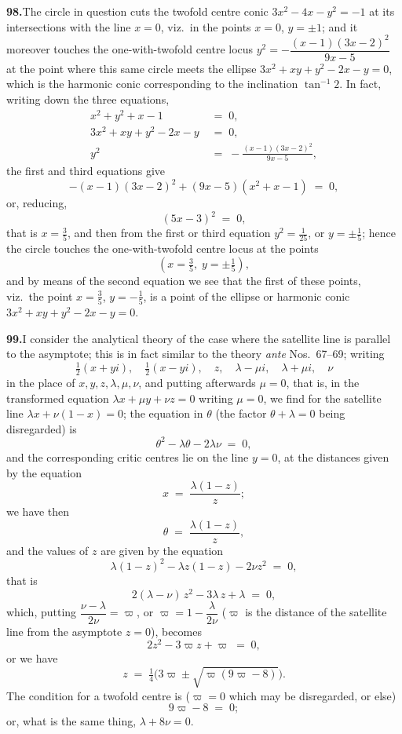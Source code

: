 \documentclass[11pt]{article}
\begin{document}
\medskip
\textbf{98.}\quad The circle in question cuts the twofold centre conic $3 x^{2} - 4 x - y^{2} = -1$ at its intersections with the line $x = 0$, viz.\ in the points $x = 0$, $y = \pm 1$; and it moreover touches the one-with-twofold centre locus $y^{2} = -\dfrac{(x-1)(3x-2)^{2}}{9 x - 5}$ at the point where this same circle meets the ellipse $3 x^{2} + x y + y^{2} - 2 x - y = 0$, which is the harmonic conic corresponding to the inclination $\tan^{-1} 2$. In fact, writing down the three equations,
\begin{align*}
x^{2} + y^{2} + x - 1 &\;=\; 0,\\
3 x^{2} + x y + y^{2} - 2 x - y &\;=\; 0,\\
y^{2} &\;=\; -\frac{(x-1)(3x-2)^{2}}{9 x - 5},
\end{align*}
the first and third equations give
\[
-(x-1)(3x-2)^{2} + (9 x - 5)(x^{2} + x - 1) \;=\; 0,
\]
or, reducing,
\[
(5 x - 3)^{2} \;=\; 0,
\]
that is $x = \tfrac{3}{5}$, and then from the first or third equation $y^{2} = \tfrac{1}{25}$, or $y = \pm\tfrac{1}{5}$; hence the circle touches the one-with-twofold centre locus at the points
\[
(x = \tfrac{3}{5},\; y = \pm\tfrac{1}{5}),
\]
and by means of the second equation we see that the first of these points, viz.\ the point $x = \tfrac{3}{5}$, $y = -\tfrac{1}{5}$, is a point of the ellipse or harmonic conic $3 x^{2} + x y + y^{2} - 2 x - y = 0$.

\medskip
\textbf{99.}\quad I consider the analytical theory of the case where the satellite line is parallel to the asymptote; this is in fact similar to the theory \emph{ante} Nos.\ 67--69; writing
\[
\tfrac{1}{2}(x + yi),\quad \tfrac{1}{2}(x - yi),\quad z,\quad \lambda - \mu i,\quad \lambda + \mu i,\quad \nu
\]
in the place of $x, y, z, \lambda, \mu, \nu$, and putting afterwards $\mu = 0$, that is, in the transformed equation $\lambda x + \mu y + \nu z = 0$ writing $\mu = 0$, we find for the satellite line $\lambda x + \nu(1 - x) = 0$; the equation in $\theta$ (the factor $\theta + \lambda = 0$ being disregarded) is
\[
\theta^{2} - \lambda \theta - 2 \lambda \nu \;=\; 0,
\]
and the corresponding critic centres lie on the line $y = 0$, at the distances given by the equation
\[
x \;=\; \frac{\lambda(1 - z)}{z};
\]
we have then
\[
\theta \;=\; \frac{\lambda(1 - z)}{z},
\]
and the values of $z$ are given by the equation
\[
\lambda(1 - z)^{2} - \lambda z(1 - z) - 2 \nu z^{2} \;=\; 0,
\]
that is
\[
2(\lambda - \nu)\, z^{2} - 3 \lambda\, z + \lambda \;=\; 0,
\]
which, putting $\dfrac{\nu - \lambda}{2\nu} = \varpi$, or $\varpi = 1 - \dfrac{\lambda}{2\nu}$ ($\varpi$ is the distance of the satellite line from the asymptote $z = 0$), becomes
\[
2 z^{2} - 3 \varpi z + \varpi \;=\; 0,
\]
or we have
\[
z \;=\; \tfrac{1}{4}\bigl(3 \varpi \pm \sqrt{\varpi(9 \varpi - 8)}\bigr).
\]
The condition for a twofold centre is ($\varpi = 0$ which may be disregarded, or else)
\[
9\varpi - 8 \;=\; 0;
\]
or, what is the same thing, $\lambda + 8 \nu = 0$.
\end{document}

